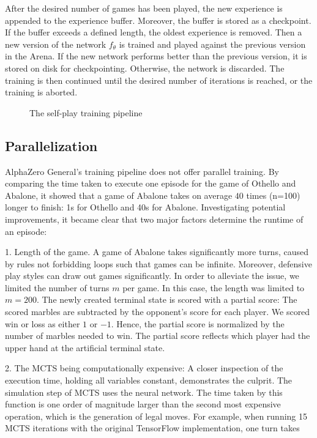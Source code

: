 After the desired number of games has been played, the new experience is appended to the experience buffer. Moreover, the buffer is stored as a checkpoint. If the buffer exceeds a defined length, the oldest experience is removed. Then a new version of the network $f_{\theta}$ is trained and played against the previous version in the Arena. If the new network performs better than the previous version, it is stored on disk for checkpointing. Otherwise, the network is discarded. The training is then continued until the desired number of iterations is reached, or the training is aborted.

\begin{figure}[H]
    \centering
    \caption{The self-play training pipeline}
    \label{training_algorithm}
\end{figure}

\subsection{Parallelization}
\label{parallelization}
AlphaZero General's training pipeline does not offer parallel training. By comparing the time taken to execute one episode for the game of Othello and Abalone, it showed that a game of Abalone takes on average $40$ times (n=100) longer to finish: 1s for Othello and 40s for Abalone. Investigating potential improvements, it became clear that two major factors determine the runtime of an episode:

1. Length of the game. A game of Abalone takes significantly more turns, caused by rules not forbidding loops such that games can be infinite. Moreover, defensive play styles can draw out games significantly. In order to alleviate the issue, we limited the number of turns $m$ per game. In this case, the length was limited to $m=200$. The newly created terminal state is scored with a partial score: The scored marbles are subtracted by the opponent's score for each player. We scored win or loss as either $1$ or $-1$. Hence, the partial score is normalized by the number of marbles needed to win. The partial score reflects which player had the upper hand at the artificial terminal state.

2. The MCTS being computationally expensive: A closer inspection of the execution time, holding all variables constant, demonstrates the culprit. The simulation step of MCTS uses the neural network. The time taken by this function is one order of magnitude larger than the second most expensive operation, which is the generation of legal moves. For example, when running 15 MCTS iterations with the original TensorFlow implementation, one turn takes

